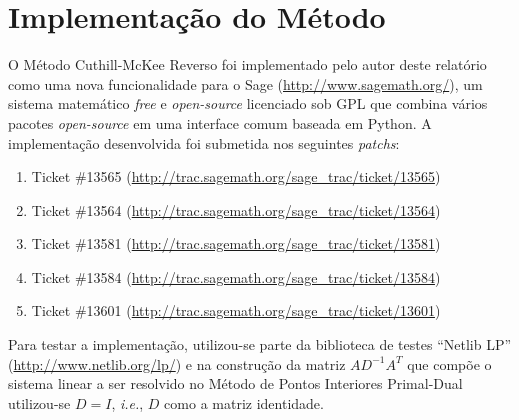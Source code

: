 \section{Implementação do Método}
O Método Cuthill-McKee Reverso foi implementado pelo autor deste relatório como
uma nova funcionalidade para o Sage (\url{http://www.sagemath.org/}), um
sistema matemático \textit{free} e \textit{open-source} licenciado sob GPL que
combina vários pacotes \textit{open-source} em uma interface comum baseada em
Python. A implementação desenvolvida foi submetida nos seguintes
\textit{patchs}:
\begin{enumerate}
    \item Ticket \#13565
        (\url{http://trac.sagemath.org/sage_trac/ticket/13565})
    \item Ticket \#13564
        (\url{http://trac.sagemath.org/sage_trac/ticket/13564})
    \item Ticket \#13581
        (\url{http://trac.sagemath.org/sage_trac/ticket/13581})
    \item Ticket \#13584
        (\url{http://trac.sagemath.org/sage_trac/ticket/13584})
    \item Ticket \#13601
        (\url{http://trac.sagemath.org/sage_trac/ticket/13601})
\end{enumerate}

Para testar a implementação, utilizou-se parte da biblioteca de testes ``Netlib LP''
(\url{http://www.netlib.org/lp/}) e na construção da matriz $A D^{-1} A^T$ que
compõe o sistema linear a ser resolvido no Método de Pontos Interiores
Primal-Dual utilizou-se $D = I$, \textit{i.e.}, $D$ como a matriz identidade.
